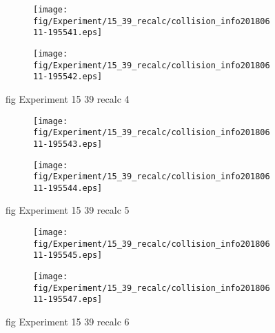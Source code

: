 \begin{figure}[H]
	\centering
	\begin{subfigure}[b]{0.9\textwidth}
		\texttt{[image: fig/Experiment/15\_39\_recalc/collision\_info20180611-195541.eps]}
		\caption{}
		\label{fig:Experiment:15_39_recalc:collision_info20180611-195541}
	\end{subfigure}

	\begin{subfigure}[b]{0.9\textwidth}
		\texttt{[image: fig/Experiment/15\_39\_recalc/collision\_info20180611-195542.eps]}
		\caption{}
		\label{fig:Experiment:15_39_recalc:collision_info20180611-195542}
	\end{subfigure}
	\caption{fig Experiment 15 39 recalc 4}
	\label{fig:Experiment:15_39_recalc:4}
\end{figure}

\begin{figure}[H]
	\centering
	\begin{subfigure}[b]{0.9\textwidth}
		\texttt{[image: fig/Experiment/15\_39\_recalc/collision\_info20180611-195543.eps]}
		\caption{}
		\label{fig:Experiment:15_39_recalc:collision_info20180611-195543}
	\end{subfigure}

	\begin{subfigure}[b]{0.9\textwidth}
		\texttt{[image: fig/Experiment/15\_39\_recalc/collision\_info20180611-195544.eps]}
		\caption{}
		\label{fig:Experiment:15_39_recalc:collision_info20180611-195544}
	\end{subfigure}
	\caption{fig Experiment 15 39 recalc 5}
	\label{fig:Experiment:15_39_recalc:5}
\end{figure}

\begin{figure}[H]
	\centering
	\begin{subfigure}[b]{0.9\textwidth}
		\texttt{[image: fig/Experiment/15\_39\_recalc/collision\_info20180611-195545.eps]}
		\caption{}
		\label{fig:Experiment:15_39_recalc:collision_info20180611-195545}
	\end{subfigure}

	\begin{subfigure}[b]{0.9\textwidth}
		\texttt{[image: fig/Experiment/15\_39\_recalc/collision\_info20180611-195547.eps]}
		\caption{}
		\label{fig:Experiment:15_39_recalc:collision_info20180611-195547}
	\end{subfigure}
	\caption{fig Experiment 15 39 recalc 6}
	\label{fig:Experiment:15_39_recalc:6}
\end{figure}

